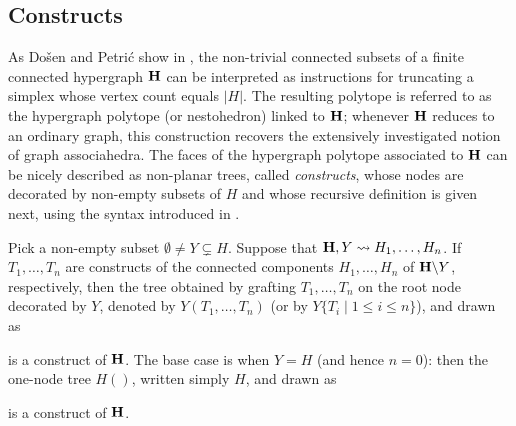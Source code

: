 \documentclass{article}
\theoremstyle{plain}
\theoremstyle{definition}
\newcommand{\set}[1]{\{#1\}}
\newcommand{\setc}[2]{\set{#1 \mid #2}}
\newcommand{\hyper}[1]{{\bf #1}}
\begin{document}
 


\subsection{Constructs} \label{constructs-subsection}
As Do\v sen and Petri\'c show in \cite{DP}, the non-trivial connected subsets of a finite connected hypergraph $\hyper{H}$ can be interpreted as instructions for truncating a simplex whose vertex count equals $|H|$. The resulting polytope is referred to as the hypergraph polytope (or nestohedron) linked to $\hyper{H}$; whenever $\hyper{H}$ reduces to an ordinary graph, this construction recovers the extensively investigated notion of graph associahedra. The faces of the hypergraph polytope associated to ${\bf H}$ can be nicely described as
non-planar trees, called {\em constructs}, whose nodes are decorated by non-empty subsets of $H$ and whose recursive definition is given next, using the syntax introduced in \cite{COI}. 

\smallskip

Pick a non-empty subset $\emptyset\neq Y \subsetneq H$. Suppose that $\hyper{H},Y \leadsto H_1,\ldots, H_n$. If $T_1, \dots, T_n$ are constructs of the connected components $H_1, \dots, H_n$ of $\hyper{H}\backslash Y$, respectively, then the tree obtained by grafting $T_1,\ldots,T_n$ on the root node decorated by $Y$, denoted by $Y(T_1,\ldots,T_n)$ (or by $Y\setc{T_i}{1\leq i\leq n}$), and drawn as 
\begin{center}
\end{center} is a construct of $\hyper{H}$. 
 The base case is when $Y=H$ (and hence $n=0$): then the one-node tree $H()$, written simply $H$, and 
drawn as
\begin{center}
\end{center}
 is a construct of $\hyper{H}$.
\end{document}
